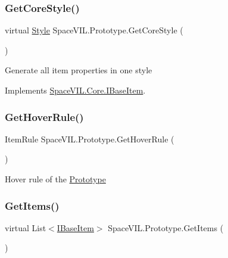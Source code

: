 \subsubsection{\texorpdfstring{Get\+Core\+Style()}{GetCoreStyle()}}
{\footnotesize\ttfamily virtual \mbox{\hyperlink{class_space_v_i_l_1_1_decorations_1_1_style}{Style}} Space\+V\+I\+L.\+Prototype.\+Get\+Core\+Style (\begin{DoxyParamCaption}{ }\end{DoxyParamCaption})\hspace{0.3cm}{\ttfamily [virtual]}}



Generate all item properties in one style 



Implements \mbox{\hyperlink{interface_space_v_i_l_1_1_core_1_1_i_base_item}{Space\+V\+I\+L.\+Core.\+I\+Base\+Item}}.

\mbox{\label{class_space_v_i_l_1_1_prototype_af90d17511ea27379d9510606938a0443}} 
\subsubsection{\texorpdfstring{Get\+Hover\+Rule()}{GetHoverRule()}}
{\footnotesize\ttfamily Item\+Rule Space\+V\+I\+L.\+Prototype.\+Get\+Hover\+Rule (\begin{DoxyParamCaption}{ }\end{DoxyParamCaption})}



Hover rule of the \mbox{\hyperlink{class_space_v_i_l_1_1_prototype}{Prototype}} 

\mbox{\label{class_space_v_i_l_1_1_prototype_a6d5e123222980d052f762368a17b6826}} 
\subsubsection{\texorpdfstring{Get\+Items()}{GetItems()}}
{\footnotesize\ttfamily virtual List$<$\mbox{\hyperlink{interface_space_v_i_l_1_1_core_1_1_i_base_item}{I\+Base\+Item}}$>$ Space\+V\+I\+L.\+Prototype.\+Get\+Items (\begin{DoxyParamCaption}{ }\end{DoxyParamCaption})\hspace{0.3cm}{\ttfamily [virtual]}}



